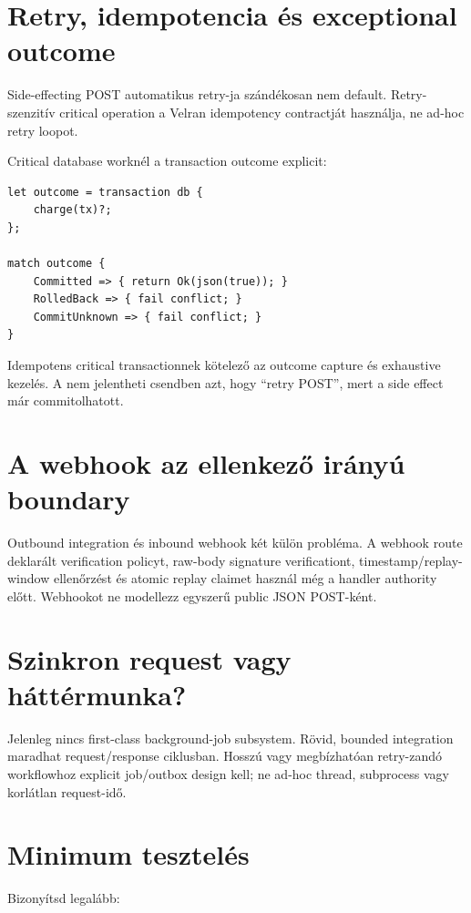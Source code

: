 \section{Retry, idempotencia és exceptional outcome}

Side-effecting POST automatikus retry-ja szándékosan nem default. Retry-szenzitív critical operation a Velran idempotency contractját használja, ne ad-hoc retry loopot.

Critical database worknél a transaction outcome explicit:

\begin{lstlisting}[language=Velran]
let outcome = transaction db {
    charge(tx)?;
};

match outcome {
    Committed => { return Ok(json(true)); }
    RolledBack => { fail conflict; }
    CommitUnknown => { fail conflict; }
}
\end{lstlisting}

Idempotens critical transactionnek kötelező az outcome capture és exhaustive kezelés. A  nem jelentheti csendben azt, hogy ``retry POST'', mert a side effect már commitolhatott.

\section{A webhook az ellenkező irányú boundary}

Outbound integration és inbound webhook két külön probléma. A webhook route deklarált verification policyt, raw-body signature verificationt, timestamp/replay-window ellenőrzést és atomic replay claimet használ még a handler authority előtt. Webhookot ne modellezz egyszerű public JSON POST-ként.

\section{Szinkron request vagy háttérmunka?}

Jelenleg nincs first-class background-job subsystem. Rövid, bounded integration maradhat request/response ciklusban. Hosszú vagy megbízhatóan retry-zandó workflowhoz explicit job/outbox design kell; ne ad-hoc thread, subprocess vagy korlátlan request-idő.

\section{Minimum tesztelés}

Bizonyítsd legalább:

